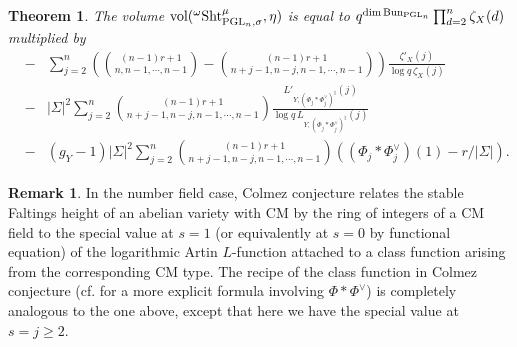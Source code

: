 \documentclass[reqno]{amsart}
\numberwithin{equation}{subsection}
\newtheorem{theorem}[subsubsection]{Theorem}
\theoremstyle{definition}
\newtheorem{remark}[subsubsection]{Remark}
\newcommand{\Bun}{\textup{Bun}}
\newcommand\Sht{\textup{Sht}}
\newcommand{\vol}{\textup{vol}}
\newcommand\PGL{\textup{PGL}}
\newcommand{\s}{\sigma}
\newcommand{\z}{\zeta}
\newcommand{\om}{\omega}
\newcommand{\Sig}{\Sigma}
\begin{document}
\begin{theorem}\label{th:vol 1-leg PGL}
The volume  $\vol({}^\om\Sht^\mu_{\PGL_n,\s}, \eta) $ is equal to $q^{\dim\Bun_{\PGL_n}} \prod_{d=2}^n\z_X(d) $ multiplied by
    \begin{eqnarray*}
   &-&\sum_{j=2}^n\left(\binom{(n-1)r+1}{n,n-1,\cdots, n-1}-\binom{(n-1)r+1}{n+j-1,n-j,n-1,\cdots, n-1}\right) \frac{\z'_X(j)}{\log q\,\z_X(j)}
 \\ 
      &-&|\Sig|^2\sum_{j=2}^n  \binom{(n-1)r+1}{n+j-1,n-j,n-1,\cdots, n-1} \frac{L'_{Y,(\Phi_j\ast\Phi_j^\vee)^\natural}(j)}{\log q\,L_{Y,(\Phi_j\ast\Phi_j^\vee)^\natural}(j)} \\
   &-&(g_Y-1) |\Sigma|^2 \sum_{j=2}^n  \binom{(n-1)r+1}{n+j-1,n-j,n-1,\cdots, n-1} ((\Phi_j\ast\Phi_j^\vee)(1)-r/|\Sigma|) .
   \end{eqnarray*}
\end{theorem}
\begin{remark}
    In the number field case, Colmez conjecture \cite{Col1} relates the stable Faltings height of an abelian variety with CM by the ring of integers of a CM field to the special value at $s=1$ (or equivalently at $s=0$ by functional equation) of the logarithmic Artin $L$-function attached to a class function arising from the corresponding CM type. The recipe of the class function in Colmez conjecture (cf. \cite[\S2]{Col2} for a more explicit formula involving $\Phi\ast\Phi^\vee$) is completely analogous to the one above, except that here we have the special value at $s=j\geq 2$. 
\end{remark}
\end{document}
